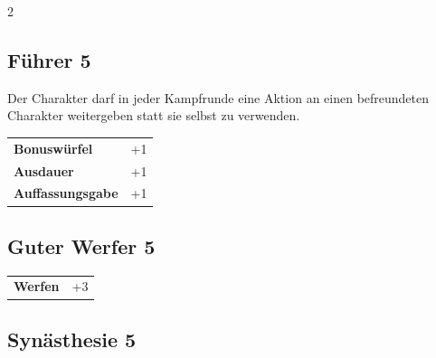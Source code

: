 \begin{multicols}{2}
\begin{tcolorbox}
\end{tcolorbox}

\begin{tcolorbox}
    \subsection*{Führer \hfill \small{5 }}
    \tcblower
Der Charakter darf in jeder Kampfrunde eine Aktion an einen befreundeten Charakter weitergeben statt sie selbst zu verwenden.


\vspace{3mm}

\begin{tabular}{@{}ll@{}}
    \textbf{Bonuswürfel} & +1\\
    \textbf{Ausdauer} & +1\\
    \textbf{Auffassungsgabe} & +1\\
\end{tabular}


\end{tcolorbox}

\begin{tcolorbox}
    \subsection*{Guter Werfer \hfill \small{5 }}
    \tcblower




\begin{tabular}{@{}ll@{}}
    \textbf{Werfen} & +3\\
\end{tabular}


\end{tcolorbox}

\begin{tcolorbox}
    \subsection*{Synästhesie \hfill \small{5 }}
    \tcblower





\end{tcolorbox}
\end{multicols}
